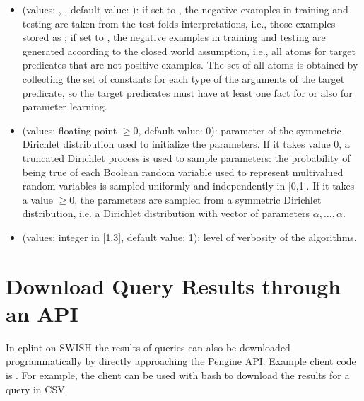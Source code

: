 \documentclass[letterpaper,10pt,english]{sphinxmanual}
\begin{document}
\begin{itemize}
\item {} 
\sphinxAtStartPar
{} (values: , , default value: ): if set to , the negative examples in training and testing are taken from the test folds interpretations, i.e., those examples  stored as ; if set to , the negative examples in training and testing are generated according to the closed world assumption, i.e., all atoms for target predicates that are not positive examples. The set of all atoms is obtained by collecting the set of constants for each type of the arguments of the target predicate, so the target predicates must have at least one fact for  or  also for parameter learning.

\item {} 
\sphinxAtStartPar
{} (values: floating point \(\geq 0\), default value: 0): parameter of the symmetric Dirichlet distribution used to initialize the parameters. If it takes value 0, a truncated Dirichlet process is used to sample parameters: the probability of being true of each Boolean random variable used to represent multivalued random variables is sampled uniformly and independently in {[}0,1{]}. If it takes a value \(\geq 0\), the parameters are sampled from a symmetric Dirichlet distribution, i.e. a Dirichlet distribution with vector of parameters \(\alpha,\ldots,\alpha\).

\item {} 
\sphinxAtStartPar
{} (values: integer in {[}1,3{]}, default value: 1): level of verbosity of the algorithms.

\end{itemize}


\chapter{Download Query Results through an API}
\label{\detokenize{index:download-query-results-through-an-api}}
\sphinxAtStartPar
In cplint on SWISH the results of queries can also be downloaded programmatically by directly approaching the Pengine API.
Example client code is .
For example, the  client can be used with bash to download the results for a query in CSV.
\end{document}
